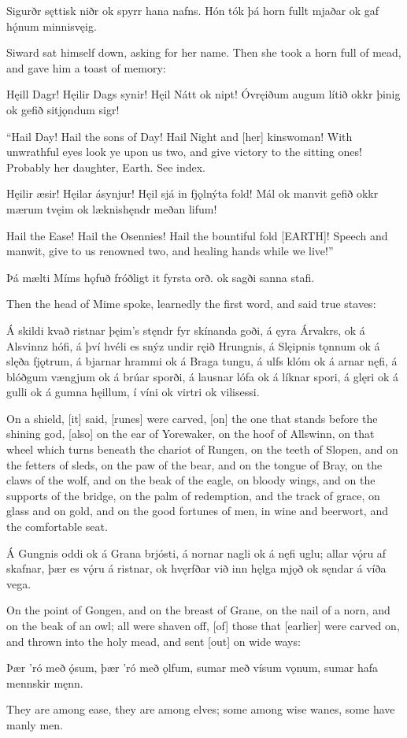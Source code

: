 Sigurðr sęttisk niðr ok spyrr hana nafns. Hón tók þá horn fullt mjaðar ok gaf hǫ́num minnisvęig. 

Siward sat himself down, asking for her name. Then she took a horn full of mead, and gave him a toast of memory:

Hęill Dagr! \hld Hęilir Dags synir!
\ind Hęil Nátt ok nipt!
Óvręiðum augum \hld lítið okkr þinig
\ind ok gefið sitjǫndum sigr! 

“Hail Day! Hail the sons of Day! Hail Night and [her] kinswoman\footnotemark[1]! With unwrathful eyes look ye upon us two, and give victory to the sitting ones!
\footnotemark[1] Probably her daughter, Earth. See index.

Hęilir æsir! \hld Hęilar ásynjur!
\ind Hęil sjá in fjǫlnýta fold!
Mál ok manvit \hld gefið okkr mærum tvęim
\ind ok læknishęndr meðan lifum! 

Hail the Ease! Hail the Osennies! Hail the bountiful fold [EARTH]! Speech and manwit, give to us renowned two, and healing hands while we live!”

Þá mælti \hld Míms hǫfuð
\ind fróðligt it fyrsta orð.
\ind ok sagði sanna stafi. 

Then the head of Mime spoke, learnedly the first word, and said true staves:

Á skildi kvað ristnar \hld þęim’s stęndr fyr skínanda goði,
á ęyra Árvakrs, \hld ok á Alsvinnz hófi,
á því hvéli es snýz \hld undir ręið Hrungnis,
á Slęipnis tǫnnum \hld ok á slęða fjǫtrum,
á bjarnar hrammi \hld ok á Braga tungu,
á ulfs klóm \hld ok á arnar nęfi,
á blóðgum vængjum \hld ok á brúar sporði,
á lausnar lófa \hld ok á líknar spori,
á glęri ok á gulli \hld ok á gumna hęillum,
í víni ok virtri \hld ok vilisessi. 

On a shield, [it] said, [runes] were carved, [on] the one that stands before the shining god, [also] on the ear of Yorewaker, on the hoof of Allswinn, on that wheel which turns beneath the chariot of Rungen, on the teeth of Slopen, and on the fetters of sleds, on the paw of the bear, and on the tongue of Bray, on the claws of the wolf, and on the beak of the eagle, on bloody wings, and on the supports of the bridge, on the palm of redemption, and the track of grace, on glass and on gold, and on the good fortunes of men, in wine and beerwort, and the comfortable seat.

Á Gungnis oddi \hld ok á Grana brjósti,
á nornar nagli \hld ok á nęfi uglu;
allar vǫ́ru af skafnar, \hld þær es vǫ́ru á ristnar,
\ind ok hvęrfðar við inn hęlga mjǫð
\ind ok sęndar á víða vega. 

On the point of Gongen, and on the breast of Grane, on the nail of a norn, and on the beak of an owl; all were shaven off, [of] those that [earlier] were carved on, and thrown into the holy mead, and sent [out] on wide ways:

Þær ’ró með ǫ́sum, \hld þær ’ró með ǫlfum,
sumar með vísum vǫnum, \hld sumar hafa mennskir męnn. 

They are among ease, they are among elves; some among wise wanes, some have manly men.
